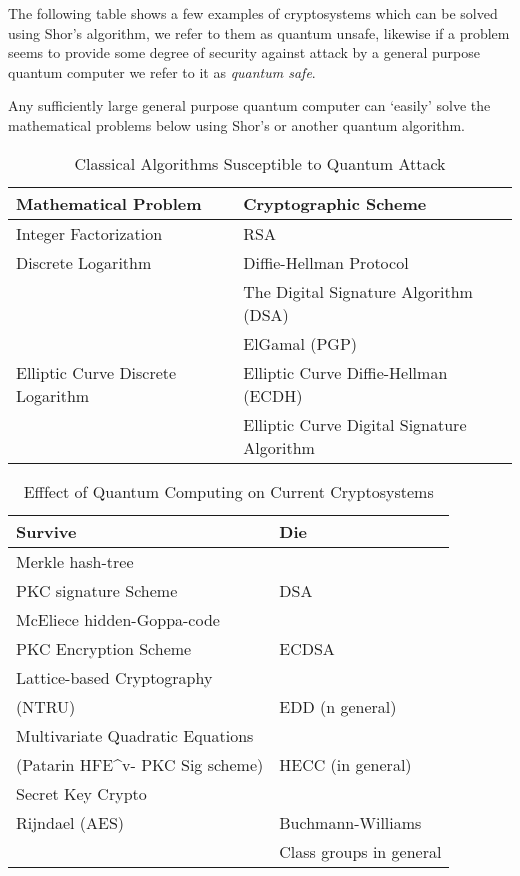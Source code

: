 The following table shows a few examples of cryptosystems which can be solved using Shor's algorithm, we refer to them as quantum unsafe, likewise if a problem seems to provide some degree of security against attack by a general purpose quantum computer we refer to it as \emph{quantum safe}.


Any sufficiently large general purpose quantum computer can `easily' solve the mathematical problems below using Shor's or another quantum algorithm. 

\begin{center}
\begin{table}
\begin{tabularx}{300pt}{|X|X|} \hline
        	\textbf{Mathematical Problem} & \textbf{Cryptographic Scheme} \\ \hline
        	Integer Factorization & RSA \\ \hline
        	Discrete Logarithm & Diffie-Hellman Protocol \\ \hline
        	& The Digital Signature Algorithm (DSA) \\ \hline
        	& ElGamal (PGP) \\ \hline
        	Elliptic Curve Discrete Logarithm & Elliptic Curve Diffie-Hellman (ECDH) \\ \hline
       	& Elliptic Curve Digital Signature Algorithm \\ \hline
\end{tabularx}
\caption{Classical Algorithms Susceptible to Quantum Attack}
\label{tb:classalgo}
\end{table}
\end{center} 

\bigskip
    
\begin{center}
\begin{table}
\caption{Efffect of Quantum Computing on Current Cryptosystems}
\begin{tabularx}{300pt}{|X|X|} \hline
\textbf{Survive} & \textbf{Die} \\ \hline
    Merkle hash-tree \\ PKC signature Scheme & DSA \\ \hline
    McEliece hidden-Goppa-code \\ PKC Encryption Scheme & ECDSA \\ \hline
    Lattice-based Cryptography \\ (NTRU) & EDD (n general) \\ \hline
    Multivariate Quadratic Equations \\ (Patarin HFE^{v-} PKC Sig scheme) & HECC (in general) \\ \hline
    Secret Key Crypto \\ Rijndael (AES) & Buchmann-Williams \\ \hline
    & Class groups in general \\ \hline
\end{tabularx}
\label{tb:pq}
\end{table}
\end{center}

